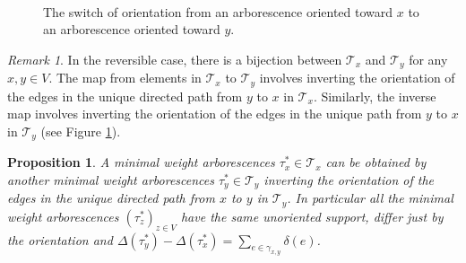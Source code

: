 \documentclass[reqno]{amsart}
\theoremstyle{plain}
\newtheorem{proposition}[theorem]{Proposition}
\theoremstyle{definition}
\theoremstyle{remark}
\newtheorem{remark}[theorem]{Remark}
\numberwithin{equation}{section}
\numberwithin{theorem}{section}
\newcommand{\<}{\langle}
\renewcommand{\>}{\rangle}
\begin{document}
\begin{figure}
	\centering
	\mbox{ 
	}
	\caption{The switch of orientation from an arborescence oriented toward $x$ to an arborescence oriented toward $y$.}\label{fig:revarb}
\end{figure}

\begin{remark}\label{remarkbij}
	In the reversible case, there is a bijection  between  $\mathcal T_x$ and $\mathcal T_y$ for any $x,y\in V$. The map from elements in $\mathcal T_x$ to $\mathcal T_y$ involves inverting the orientation of the edges in the unique directed path from $y$ to $x$ in $\mathcal T_x$. Similarly, the inverse map involves inverting the orientation of the edges in the unique path from $y$ to $x$ in $\mathcal T_y$ (see Figure \ref{fig:revarb}).
\end{remark}



\begin{proposition}
	A minimal weight arborescences ${\mathcal \tau}^*_x\in {\mathcal T}_x$ can be obtained by another minimal weight arborescences ${\mathcal \tau}^*_y\in {\mathcal T}_y$ inverting the orientation of the edges in the unique directed path from $x$ to $y$ in $\mathcal T_y$. In particular all the minimal weight arborescences $({\mathcal \tau}^*_z)_{z\in V}$ have the same unoriented support, differ just by the orientation and $\Delta\left({\mathcal \tau}^*_y\right)-\Delta\left({\mathcal \tau}^*_x\right)=\sum_{e\in \gamma_{x,y}}\delta(e)$.
\end{proposition}
\end{document}

